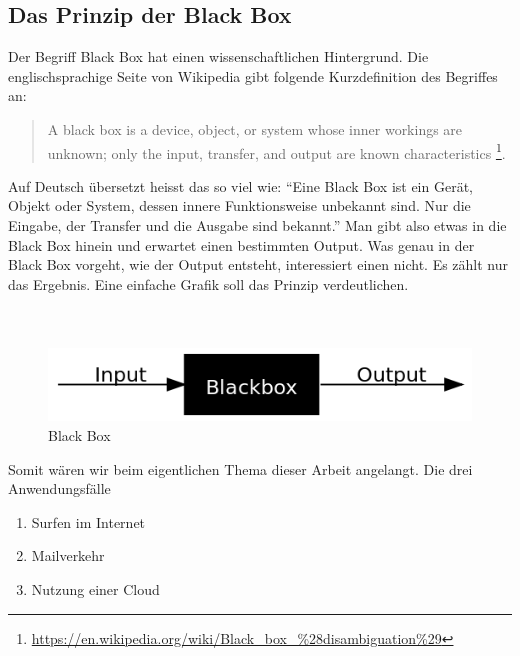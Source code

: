 \subsection{Das Prinzip der Black Box}
Der Begriff Black Box hat einen wissenschaftlichen Hintergrund. Die englischsprachige Seite von Wikipedia gibt folgende Kurzdefinition des Begriffes an:

\begin{quote}
A black box is a device, object, or system whose inner workings are unknown; only the input, transfer, and output are known characteristics
\footnote{\url{https://en.wikipedia.org/wiki/Black_box_\%28disambiguation\%29}}.
\end{quote}

Auf Deutsch übersetzt heisst das so viel wie: ``Eine Black Box ist ein Gerät, Objekt oder System, dessen innere Funktionsweise unbekannt sind. Nur die Eingabe, der Transfer und die Ausgabe sind bekannt.''
Man gibt also etwas in die Black Box hinein und erwartet einen bestimmten Output. Was genau in der Black Box vorgeht, wie der Output entsteht, interessiert einen nicht. Es zählt nur das Ergebnis. Eine einfache Grafik soll das Prinzip verdeutlichen. 
\\
\\
\\

\begin{figure}[h]
\centering
\includegraphics[scale=0.75]{images/BlackBox}
\caption{Black Box}
\end{figure}

Somit wären wir beim eigentlichen Thema dieser Arbeit angelangt. Die drei Anwendungsfälle

\begin{enumerate}
\item Surfen im Internet
\item Mailverkehr
\item Nutzung einer Cloud
\end{enumerate}

